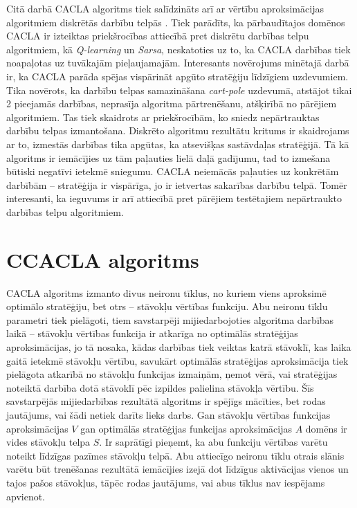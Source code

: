 \documentclass{ludis} %
\begin{document}
Citā darbā CACLA algoritms tiek salīdzināts arī ar vērtību aproksimācijas
algoritmiem diskrētās darbību telpās \autocite{Hasselt2009}. Tiek parādīts, ka
pārbaudītajos domēnos CACLA ir izteiktas priekšrocības attiecībā pret diskrētu
darbības telpu algoritmiem, kā \textit{Q-learning} un \textit{Sarsa},
neskatoties uz to, ka CACLA darbības tiek noapaļotas uz tuvākajām pieļaujamajām.
Interesants novērojums minētajā darbā ir, ka CACLA parāda spējas vispārināt
apgūto stratēģiju līdzīgiem uzdevumiem. Tika novērots, ka darbību telpas
samazināšana \textit{cart-pole} uzdevumā, atstājot tikai 2 pieejamās darbības,
neprasīja algoritma pārtrenēšanu, atšķirībā no pārējiem algoritmiem. Tas tiek
skaidrots ar priekšrocībām, ko sniedz nepārtrauktas darbību telpas izmantošana.
Diskrēto algoritmu rezultātu kritums ir skaidrojams ar to, izmestās darbības
tika apgūtas, ka atsevišķas sastāvdaļas stratēģijā. Tā kā algoritms ir
iemācījies uz tām paļauties lielā daļā gadījumu, tad to izmešana būtiski
negatīvi ietekmē sniegumu. CACLA neiemācās paļauties uz konkrētām darbībām --
stratēģija ir vispārīga, jo ir ietvertas sakarības darbību telpā. Tomēr
interesanti, ka ieguvums ir arī attiecībā pret pārējiem testētajiem nepārtraukto
darbības telpu algoritmiem.

\section{CCACLA algoritms}\label{sec:ccacla}
CACLA algoritms izmanto divus neironu tīklus, no kuriem viens aproksimē optimālo
stratēģiju, bet otrs -- stāvokļu vērtības funkciju. Abu neironu tīklu parametri
tiek pielāgoti, tiem savstarpēji mijiedarbojoties algoritma darbības laikā --
stāvokļu vērtības funkcija ir atkarīga no optimālās stratēģijas aproksimācijas,
jo tā nosaka, kādas darbības tiek veiktas katrā stāvoklī, kas laika gaitā
ietekmē stāvokļu vērtību, savukārt optimālās stratēģijas aproksimācija tiek
pielāgota atkarībā no stāvokļu funkcijas izmaiņām, ņemot vērā, vai stratēģijas
noteiktā darbība dotā stāvoklī pēc izpildes palielina stāvokļa vērtību. Šīs
savstarpējās mijiedarbības rezultātā algoritms ir spējīgs mācīties, bet rodas
jautājums, vai šādi netiek darīts lieks darbs. Gan stāvokļu vērtības funkcijas
aproksimācijas $V$ gan optimālās stratēģijas funkcijas aproksimācijas $A$ domēns
ir vides stāvokļu telpa $S$. Ir saprātīgi pieņemt, ka abu funkciju vērtības
varētu noteikt līdzīgas pazīmes stāvokļu telpā. Abu attiecīgo neironu tīklu
otrais slānis varētu būt trenēšanas rezultātā iemācījies izejā dot līdzīgus
aktivācijas vienos un tajos pašos stāvokļus, tāpēc rodas jautājums, vai abus
tīklus nav iespējams apvienot.
\end{document}
